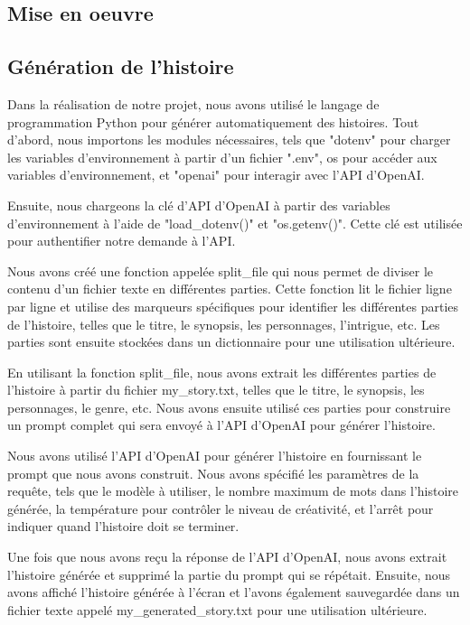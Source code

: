 \documentclass[11,5pt]{report}
\begin{document}
\begin{spacing}{2}
\section{Mise en oeuvre}

\subsection{Génération de l'histoire}
Dans la réalisation de notre projet, nous avons utilisé le langage de programmation Python pour générer automatiquement des histoires. Tout d'abord, nous importons les modules nécessaires, tels que "dotenv" pour charger les variables d'environnement à partir d'un fichier ".env", os pour accéder aux variables d'environnement, et "openai" pour interagir avec l'API d'OpenAI\cite{OpenAIDocs}\cite{OpenAIGit}.

Ensuite, nous chargeons la clé d'API d'OpenAI\cite{OpenAIDocs} à partir des variables d'environnement à l'aide de "load\_dotenv()" et "os.getenv()". Cette clé est utilisée pour authentifier notre demande à l'API.

Nous avons créé une fonction appelée split\_file qui nous permet de diviser le contenu d'un fichier texte en différentes parties. Cette fonction lit le fichier ligne par ligne et utilise des marqueurs spécifiques pour identifier les différentes parties de l'histoire, telles que le titre, le synopsis, les personnages, l'intrigue, etc. Les parties sont ensuite stockées dans un dictionnaire pour une utilisation ultérieure.

En utilisant la fonction split\_file, nous avons extrait les différentes parties de l'histoire à partir du fichier my\_story.txt, telles que le titre, le synopsis, les personnages, le genre, etc. Nous avons ensuite utilisé ces parties pour construire un prompt complet qui sera envoyé à l'API d'OpenAI\cite{OpenAIDocs} pour générer l'histoire.

Nous avons utilisé l'API d'OpenAI\cite{OpenAIDocs} pour générer l'histoire en fournissant le prompt que nous avons construit. Nous avons spécifié les paramètres de la requête, tels que le modèle à utiliser, le nombre maximum de mots dans l'histoire générée, la température pour contrôler le niveau de créativité, et l'arrêt pour indiquer quand l'histoire doit se terminer.

Une fois que nous avons reçu la réponse de l'API d'OpenAI\cite{OpenAIDocs}, nous avons extrait l'histoire générée et supprimé la partie du prompt qui se répétait. Ensuite, nous avons affiché l'histoire générée à l'écran et l'avons également sauvegardée dans un fichier texte appelé my\_generated\_story.txt pour une utilisation ultérieure.\newline



\end{spacing}
\end{document}
